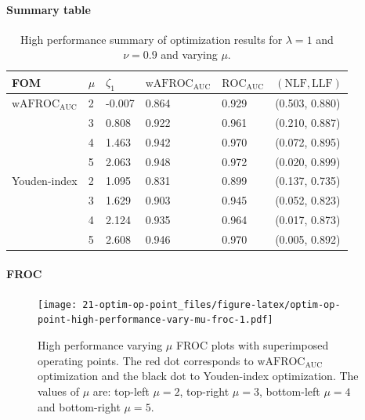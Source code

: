 \documentclass[
]{book}
\begin{document}
\hypertarget{summary-table-4}{%
\paragraph{Summary table}\label{summary-table-4}}

\begin{table}

\caption{\label{tab:optim-op-point-high-performance-vary-mu-table}High performance summary of optimization results for $\lambda = 1$ and $\nu = 0.9$ and varying $\mu$.}
\centering
\fontsize{10}{12}\selectfont
\begin{tabular}[t]{llllll}
\toprule
FOM & $\mu$ & $\zeta_1$ & $\text{wAFROC}_\text{AUC}$ & $\text{ROC}_\text{AUC}$ & $\left( \text{NLF}, \text{LLF}\right)$\\
\midrule
$\text{wAFROC}_\text{AUC}$ & 2 & -0.007 & 0.864 & 0.929 & (0.503, 0.880)\\
 & 3 & 0.808 & 0.922 & 0.961 & (0.210, 0.887)\\
 & 4 & 1.463 & 0.942 & 0.970 & (0.072, 0.895)\\
 & 5 & 2.063 & 0.948 & 0.972 & (0.020, 0.899)\\
Youden-index & 2 & 1.095 & 0.831 & 0.899 & (0.137, 0.735)\\
\addlinespace
 & 3 & 1.629 & 0.903 & 0.945 & (0.052, 0.823)\\
 & 4 & 2.124 & 0.935 & 0.964 & (0.017, 0.873)\\
 & 5 & 2.608 & 0.946 & 0.970 & (0.005, 0.892)\\
\bottomrule
\end{tabular}
\end{table}

\hypertarget{froc-5}{%
\paragraph{FROC}\label{froc-5}}

\begin{figure}
\centering
\texttt{[image: 21-optim-op-point\_files/figure-latex/optim-op-point-high-performance-vary-mu-froc-1.pdf]}
\caption{\label{fig:optim-op-point-high-performance-vary-mu-froc}High performance varying \(\mu\) FROC plots with superimposed operating points. The red dot corresponds to \(\text{wAFROC}_\text{AUC}\) optimization and the black dot to Youden-index optimization. The values of \(\mu\) are: top-left \(\mu = 2\), top-right \(\mu = 3\), bottom-left \(\mu = 4\) and bottom-right \(\mu = 5\).}
\end{figure}
\end{document}
